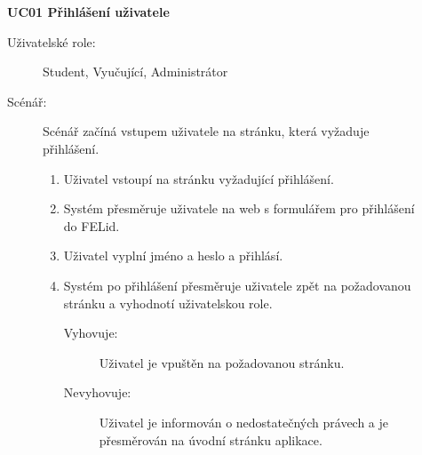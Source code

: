 \begin{description}
    \item[] \textbf{UC01 Přihlášení uživatele}
        \begin{description}
            \item[Uživatelské role:] Student, Vyučující, Administrátor
            \item[Scénář:] Scénář začíná vstupem uživatele na stránku, která vyžaduje přihlášení. 
                \begin{enumerate}
                    \item Uživatel vstoupí na stránku vyžadující přihlášení.  
                    \item Systém přesměruje uživatele na web s formulářem pro přihlášení do FELid.
                    \item Uživatel vyplní jméno a heslo a přihlásí.
                    \item Systém po přihlášení přesměruje uživatele zpět na požadovanou stránku a vyhodnotí uživatelskou role.
                        \begin{description}
                            \item[Vyhovuje:] Uživatel je vpuštěn na požadovanou stránku.
                            \item[Nevyhovuje:] Uživatel je informován o nedostatečných právech a je přesměrován na úvodní stránku aplikace.
                        \end{description}
                \end{enumerate}
        \end{description}
\end{description}

